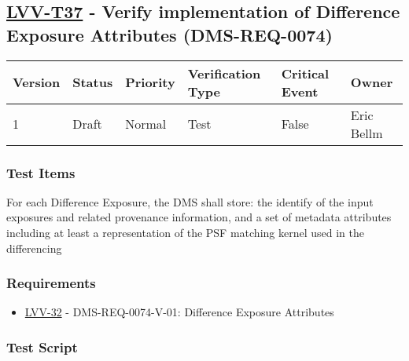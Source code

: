\hypertarget{lvv-t37---verify-implementation-of-difference-exposure-attributes-dms-req-0074}{%
\subsection{\texorpdfstring{\href{https://jira.lsstcorp.org/secure/Tests.jspa\#/testCase/LVV-T37}{LVV-T37}
- Verify implementation of Difference Exposure Attributes
(DMS-REQ-0074)}{LVV-T37 - Verify implementation of Difference Exposure Attributes (DMS-REQ-0074)}}\label{lvv-t37---verify-implementation-of-difference-exposure-attributes-dms-req-0074}}

\begin{longtable}[]{@{}llllll@{}}
\toprule
Version & Status & Priority & Verification Type & Critical Event &
Owner\tabularnewline
\midrule
\endhead
1 & Draft & Normal & Test & False & Eric Bellm\tabularnewline
\bottomrule
\end{longtable}

\hypertarget{test-items-13}{%
\subsubsection{Test Items}\label{test-items-13}}

For each Difference Exposure, the DMS shall store: the identify of the
input exposures and related provenance information, and a set of
metadata attributes including at least a representation of the PSF
matching kernel used in the differencing

\hypertarget{requirements-14}{%
\subsubsection{Requirements}\label{requirements-14}}

\begin{itemize}
\tightlist
\item
  \href{https://jira.lsstcorp.org/browse/LVV-32}{LVV-32} -
  DMS-REQ-0074-V-01: Difference Exposure Attributes
\end{itemize}

\hypertarget{test-script-14}{%
\subsubsection{Test Script}\label{test-script-14}}

